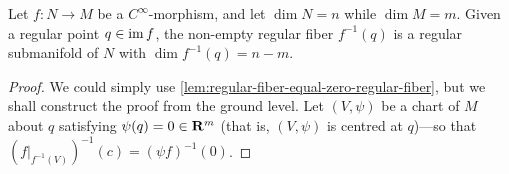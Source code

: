 \begin{theorem}
\label{thm:regular-fiber-theorem}
Let \(f: N \to M\) be a \(C^{\infty}\)-morphism, and let \(\dim N = n\) while
\(\dim M = m\). Given a regular point \(q \in \operatorname{im} f\), the non-empty regular
fiber \(f^{-1}(q)\) is a regular submanifold of \(N\) with
\(\dim f^{-1}(q) = n - m\).
\end{theorem}

\begin{proof}
We could simply use \cref{lem:regular-fiber-equal-zero-regular-fiber}, but we
shall construct the proof from the ground level. Let \((V, \psi)\) be a chart of
\(M\) about \(q\) satisfying \(\psi(q) = 0 \in \mathbf{R}^m\) (that is, \((V, \psi)\) is
centred at \(q\))---so that \((f|_{f^{-1}(V)})^{-1}(c) = (\psi f)^{-1}(0)\).
\end{proof}


